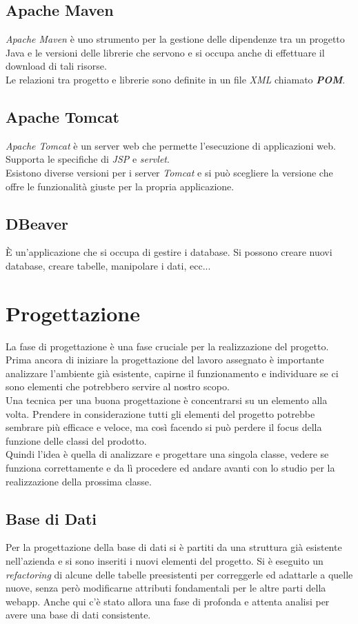 \subsection*{Apache Maven}
\textit{Apache Maven} è uno strumento per la gestione delle dipendenze tra un progetto Java e le versioni delle librerie che servono e si occupa anche di effettuare il download di tali risorse. \\
Le relazioni tra progetto e librerie sono definite in un file \textit{XML} chiamato \textit{\textbf{POM}}.

\subsection*{Apache Tomcat}
\textit{Apache Tomcat} è un server web che permette l'esecuzione di applicazioni web. Supporta le specifiche di \textit{JSP} e \textit{servlet}.\\
Esistono diverse versioni per i server \textit{Tomcat} e si può scegliere la versione che offre le funzionalità giuste per la propria applicazione.
\subsection*{DBeaver}
È un'applicazione che si occupa di gestire i database. Si possono creare nuovi database, creare tabelle, manipolare i dati, ecc...

\section{Progettazione}
\label{sec:progettazione}
La fase di progettazione è una fase cruciale per la realizzazione del progetto. Prima ancora di iniziare la progettazione del lavoro assegnato è importante analizzare l'ambiente già esistente, capirne il funzionamento e individuare se ci sono elementi che potrebbero servire al nostro scopo. \\
Una tecnica per una buona progettazione è concentrarsi su un elemento alla volta. Prendere in considerazione tutti gli elementi del progetto potrebbe sembrare più efficace e veloce, ma così facendo si può perdere il focus della funzione delle classi del prodotto.\\ 
Quindi l'idea è quella di analizzare e progettare una singola classe, vedere se funziona correttamente e da lì procedere ed andare avanti con lo studio per la realizzazione della prossima classe.
\subsection*{Base di Dati}
Per la progettazione della base di dati si è partiti da una struttura già esistente nell'azienda e si sono inseriti i nuovi elementi del progetto. Si è eseguito un \textit{refactoring} di alcune delle tabelle preesistenti per correggerle ed adattarle a quelle nuove, senza però modificarne attributi fondamentali per le altre parti della webapp. Anche qui c'è stato allora una fase di profonda e attenta analisi per avere una base di dati consistente. 
